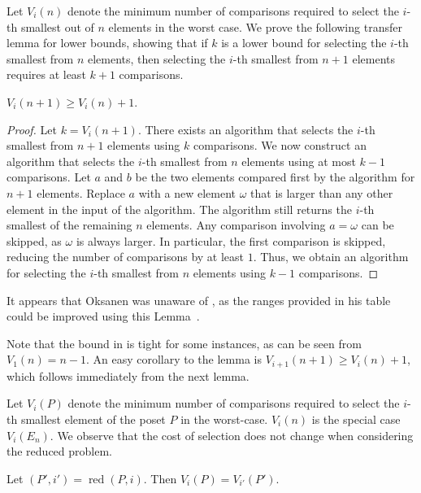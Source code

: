 \documentclass[a4paper,UKenglish,cleveref, autoref, thm-restate]{lipics-v2021}
\newcommand{\reduced}[1]{\operatorname{red}#1}
\begin{document}
Let $V_i(n)$ denote the minimum number of comparisons required to select the $i$-th smallest out of $n$ elements in the worst case.
We prove the following transfer lemma for lower bounds, showing that if $k$ is a lower bound for selecting the $i$-th smallest from $n$ elements, then selecting the $i$-th smallest from $n + 1$ elements requires at least $k + 1$ comparisons.

\begin{lemma} \label{lemma:previous_next_poset}
  $V_i(n + 1) \geq V_i(n) + 1$.
\end{lemma}

\begin{proof}
  Let $k = V_i(n + 1)$.
  There exists an algorithm that selects the $i$-th smallest from $n + 1$ elements using $k$ comparisons.
  We now construct an algorithm that selects the $i$-th smallest from $n$ elements using at most $k - 1$ comparisons.
  Let $a$ and $b$ be the two elements compared first by the algorithm for $n + 1$ elements.
  Replace $a$ with a new element $\omega$ that is larger than any other element in the input of the algorithm.
  The algorithm still returns the $i$-th smallest of the remaining $n$ elements.
  Any comparison involving $a = \omega$ can be skipped, as $\omega$ is always larger.
  In particular, the first comparison is skipped, reducing the number of comparisons by at least $1$.
  Thus, we obtain an algorithm for selecting the $i$-th smallest from $n$ elements using $k - 1$ comparisons.
\end{proof}

\begin{remark}
  It appears that Oksanen was unaware of , as the ranges provided in his table could be improved using this Lemma~\cite{Oksanen}.
\end{remark}

Note that the bound in  is tight for some instances, as can be seen from $V_1(n) = n - 1$.
An easy corollary to the lemma is $V_{i + 1}(n + 1) \geq V_i(n) + 1$, which follows immediately from the next lemma.

Let $V_i(P)$ denote the minimum number of comparisons required to select the $i$-th smallest element of the poset $P$ in the worst-case.
$V_i(n)$ is the special case $V_i(E_n)$.
We observe that the cost of selection does not change when considering the reduced problem.

\begin{observation}
  Let $(P', i') = \reduced{(P, i)}$.
  Then $V_i(P) = V_{i'}(P')$.
\end{observation}
\end{document}
